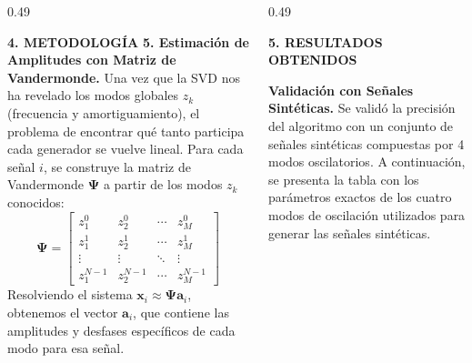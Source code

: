 \documentclass[final]{beamer}
\begin{document}
\begin{frame}[t]
\begin{columns}[t,totalwidth=\textwidth]
\begin{column}{0.49\textwidth}
\begin{block}{\textbf{4. METODOLOGÍA}}
    \textbf{5. Estimación de Amplitudes con Matriz de Vandermonde.}
    Una vez que la SVD nos ha revelado los modos globales $z_k$ (frecuencia y 
    amortiguamiento), el problema de encontrar qué tanto participa cada generador 
    se vuelve lineal. Para cada señal $i$, se construye la matriz de Vandermonde 
    $\mathbf{\Psi}$ a partir de los modos $z_k$ conocidos:
    \begin{equation}
    \mathbf{\Psi} =
    \begin{bmatrix}
    z_1^0 & z_2^0 & \cdots & z_M^0 \\
    z_1^1 & z_2^1 & \cdots & z_M^1 \\
    \vdots & \vdots & \ddots & \vdots \\
    z_1^{N-1} & z_2^{N-1} & \cdots & z_M^{N-1}
    \end{bmatrix}
    \end{equation}
    Resolviendo el sistema $\mathbf{x}_i \approx \mathbf{\Psi} \mathbf{a}_i$, 
    obtenemos el vector $\mathbf{a}_i$, que contiene las amplitudes y desfases 
    específicos de cada modo para esa señal.
    

    \end{block}
  \end{column}

  \begin{column}{0.49\textwidth}
    \begin{block}{\textbf{5. RESULTADOS OBTENIDOS}}
    
  \textbf{Validación con Señales Sintéticas.} Se validó la precisión del algoritmo con un conjunto 
  de señales sintéticas compuestas por 4 modos oscilatorios. A continuación, se presenta la tabla 
  con los parámetros exactos de los cuatro modos de oscilación utilizados para generar las señales
  sintéticas.


\end{block}
\end{column}
\end{columns}
\end{frame}
\end{document}
